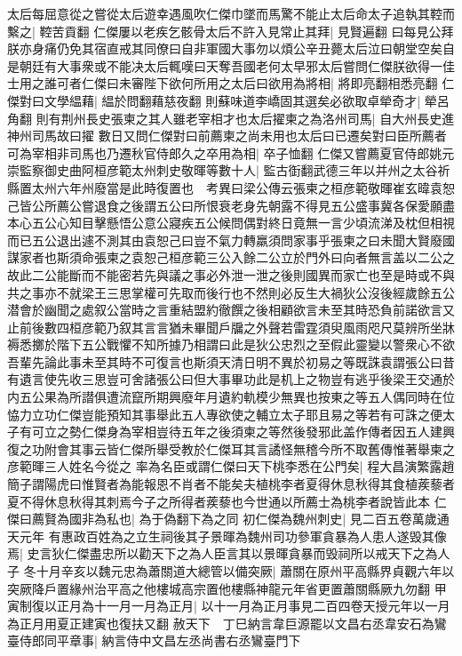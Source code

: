 太后每屈意從之嘗從太后遊幸遇風吹仁傑巾墜而馬驚不能止太后命太子追執其鞚而繫之|{
	鞚苦貢翻}
仁傑屢以老疾乞骸骨太后不許入見常止其拜|{
	見賢遍翻}
曰每見公拜朕亦身痛仍免其宿直戒其同僚曰自非軍國大事勿以煩公辛丑薨太后泣曰朝堂空矣自是朝廷有大事衆或不能决太后輒嘆曰天奪吾國老何太早邪太后嘗問仁傑朕欲得一佳士用之誰可者仁傑曰未審陛下欲何所用之太后曰欲用為將相|{
	將即亮翻相悉亮翻}
仁傑對曰文學緼藉|{
	緼於問翻藉慈夜翻}
則蘇味道李嶠固其選矣必欲取卓犖奇才|{
	犖呂角翻}
則有荆州長史張柬之其人雖老宰相才也太后擢柬之為洛州司馬|{
	自大州長史進神州司馬故曰擢}
數日又問仁傑對曰前薦柬之尚未用也太后曰已遷矣對曰臣所薦者可為宰相非司馬也乃遷秋官侍郎久之卒用為相|{
	卒子恤翻}
仁傑又嘗薦夏官侍郎姚元崇監察御史曲阿桓彦範太州刺史敬暉等數十人|{
	監古衘翻武德三年以并州之太谷祈縣置太州六年州廢當是此時復置也　考異曰梁公傳云張柬之桓彦範敬暉崔玄暐袁恕己皆公所薦公嘗退食之後謂五公曰所恨衰老身先朝露不得見五公盛事冀各保愛願盡本心五公心知目擊懸悟公意公寢疾五公候問偶對終日竟無一言少頃流涕及枕但相視而已五公退出遽不測其由袁恕己曰豈不氣力轉羸須問家事乎張柬之曰未聞大賢廢國謀家者也斯須命張柬之袁恕己桓彦範三公入餘二公立於門外曰向者無言盖以二公之故此二公能斷而不能密若先與議之事必外泄一泄之後則國異而家亡也至是時或不與共之事亦不就梁王三思掌權可先取而後行也不然則必反生大禍狄公沒後經歲餘五公潜會於幽聞之處叙公當時之言重結盟約徹饌之後相顧欲言未至其時恐負前諾欲言又止前後數四桓彦範乃叙其言言猶未畢聞戶牖之外聲若雷霆須臾風雨咫尺莫辨所坐牀褥悉擲於階下五公戰懼不知所據乃相謂曰此是狄公忠烈之至假此靈變以警衆心不欲吾輩先論此事未至其時不可復言也斯須天清日明不異於初易之等既誅袁謂張公曰昔有遺言使先收三思豈可舍諸張公曰但大事畢功此是机上之物豈有逃乎後梁王交通於内五公果為所譛俱遭流竄所期興廢年月遺約軌模少無異也按東之等五人偶同時在位恊力立功仁傑豈能預知其事舉此五人專欲使之輔立太子耶且易之等若有可誅之便太子有可立之勢仁傑身為宰相豈待五年之後須柬之等然後發邪此盖作傳者因五人建興復之功附會其事云皆仁傑所舉受教於仁傑耳其言譎怪無稽今所不取舊傳惟著舉柬之彦範暉三人姓名今從之}
率為名臣或謂仁傑曰天下桃李悉在公門矣|{
	程大昌演繁露趙簡子謂陽虎曰惟賢者為能報恩不肖者不能矣夫植桃李者夏得休息秋得其食植蒺藜者夏不得休息秋得其刺焉今子之所得者蒺藜也今世通以所薦士為桃李者說皆此本}
仁傑曰薦賢為國非為私也|{
	為于偽翻下為之同}
初仁傑為魏州刺史|{
	見二百五卷萬歲通天元年}
有惠政百姓為之立生祠後其子景暉為魏州司功參軍貪暴為人患人遂毁其像焉|{
	史言狄仁傑盡忠所以勸天下之為人臣言其以景暉貪暴而毁祠所以戒天下之為人子}
冬十月辛亥以魏元忠為蕭關道大總管以備突厥|{
	蕭關在原州平高縣界貞觀六年以突厥降戶置緣州治平高之他樓城高宗置他樓縣神龍元年省更置蕭關縣厥九勿翻}
甲寅制復以正月為十一月一月為正月|{
	以十一月為正月事見二百四卷天授元年以一月為正月用夏正建寅也復扶又翻}
赦天下　丁巳納言韋巨源罷以文昌右丞韋安石為鸞臺侍郎同平章事|{
	納言侍中文昌左丞尚書右丞鸞臺門下}
